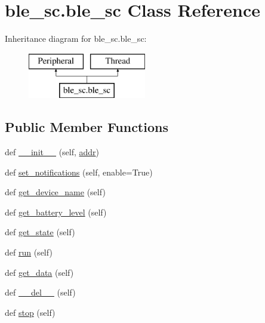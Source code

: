 \hypertarget{classble__sc_1_1ble__sc}{}\section{ble\+\_\+sc.\+ble\+\_\+sc Class Reference}
\label{classble__sc_1_1ble__sc}
Inheritance diagram for ble\+\_\+sc.\+ble\+\_\+sc\+:\begin{figure}[H]
\begin{center}
\leavevmode
\includegraphics[height=2.000000cm]{classble__sc_1_1ble__sc}
\end{center}
\end{figure}
\subsection*{Public Member Functions}
\begin{DoxyCompactItemize}
\item 
def \hyperlink{classble__sc_1_1ble__sc_aa2c805418fadd328a3fda4c08cd267e9}{\+\_\+\+\_\+init\+\_\+\+\_\+} (self, \hyperlink{classble__sc_1_1ble__sc_afa92ff7157c4bdf0af9755643135f930}{addr})
\item 
def \hyperlink{classble__sc_1_1ble__sc_a1de425ebd84b004a47b68be4707f0c81}{set\+\_\+notifications} (self, enable=True)
\item 
def \hyperlink{classble__sc_1_1ble__sc_abe9b03263bd0d7e8db523e940b13794a}{get\+\_\+device\+\_\+name} (self)
\item 
def \hyperlink{classble__sc_1_1ble__sc_a20b6268e202b79883c487ca3826fe521}{get\+\_\+battery\+\_\+level} (self)
\item 
def \hyperlink{classble__sc_1_1ble__sc_a412188403c86a115b1457c731c3b8b03}{get\+\_\+state} (self)
\item 
def \hyperlink{classble__sc_1_1ble__sc_ad54a981de790eff2f9543fd28c1d21fb}{run} (self)
\item 
def \hyperlink{classble__sc_1_1ble__sc_a97ac48791074b904c8fa68c9ce0f709f}{get\+\_\+data} (self)
\item 
def \hyperlink{classble__sc_1_1ble__sc_a8df772741eddf5d86cabcf98587e7439}{\+\_\+\+\_\+del\+\_\+\+\_\+} (self)
\item 
def \hyperlink{classble__sc_1_1ble__sc_ae3ccbb4eed28452868695db039c1d9d2}{stop} (self)
\end{DoxyCompactItemize}
